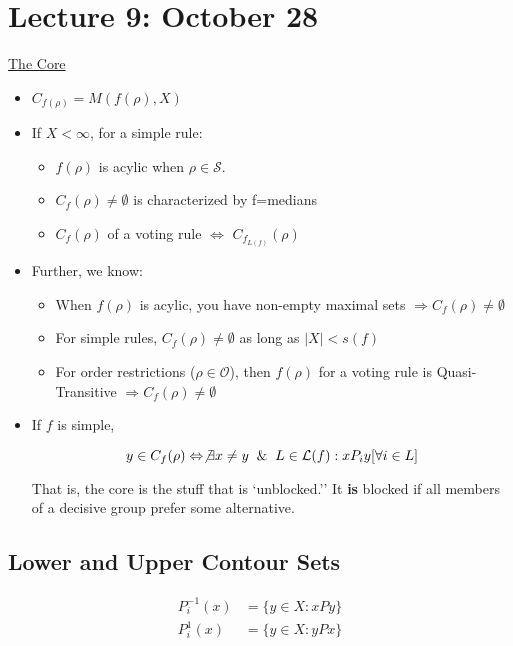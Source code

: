 \documentclass{article}
\newcommand{\Lm}{\mathcal{L}}
\newcommand{\Om}{\mathcal{O}}
\newcommand{\core}{C_{f}(\rho)}
\begin{document}
\section*{Lecture 9: October 28}
\underline{The Core}
\begin{itemize}
  \item $C_{f(\rho)} = M(f(\rho),X)$

  \item If $X<\infty$, for a simple rule:
  \begin{itemize}
    \item $f(\rho)$ is acylic when $\rho \in \mathcal{S}$.
    \item $\core \neq \emptyset $ is characterized by f=medians
    \item $\core$ of a voting rule $\Leftrightarrow$ $C_{f_{L(f)}}(\rho)$
  \end{itemize}
  \item Further, we know: 
  \begin{itemize}
  
  \item When $f(\rho)$ is acylic, you have non-empty maximal sets $\Rightarrow \core \neq \emptyset$ 
  \item For simple rules, $\core \neq \emptyset$ as long as $|X| < s(f)$
  \item For order restrictions ($\rho \in \Om$), then $f(\rho)$ for a voting rule is Quasi-Transitive $\Rightarrow \core \neq \emptyset$ 
  \end{itemize}
\end{itemize}



\begin{itemize}

\item If $f$ is simple, 

\[
y \in \core \Leftrightarrow \not \exists x\neq y \;\;\&\;\; L\in\Lm(f): xP_iy [\forall i \in L]
\]

That is, the core is the stuff that is `unblocked.'' It \textbf{is} blocked if all members of a decisive group prefer some alternative.
\end{itemize}

\subsection*{Lower and Upper Contour Sets}

\begin{align*}
P_i^{-1}(x) &= \{y\in X: xPy\}\\
P_i^{1}(x) &= \{y\in X: yPx\}
\end{align*}
\end{document}
